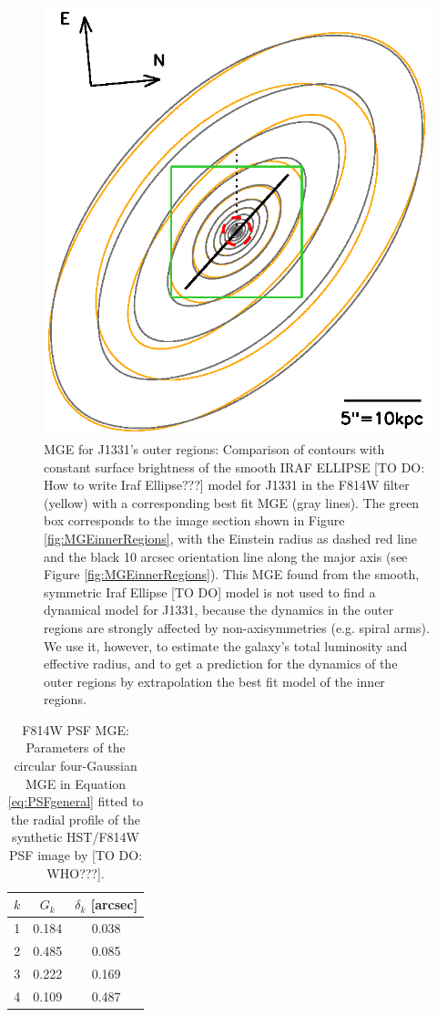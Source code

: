 \begin{figure}
\centering
\includegraphics[width=0.8\columnwidth]{fig/1331F814W_MGE_disk_L.ps}
\caption{MGE for J1331's outer regions: Comparison of contours with constant surface brightness of the smooth IRAF ELLIPSE [TO DO: How to write Iraf Ellipse???] model for J1331 in the F814W filter (yellow) with a corresponding best fit MGE (gray lines). The green box corresponds to the image section shown in Figure \ref{fig:MGEinnerRegions}, with the Einstein radius as dashed red line and the black 10 arcsec orientation line along the major axis (see Figure \ref{fig:MGEinnerRegions}). This MGE found from the smooth, symmetric Iraf Ellipse [TO DO] model is not used to find a dynamical model for J1331, because the dynamics in the outer regions are strongly affected by non-axisymmetries (e.g. spiral arms). We use it, however, to estimate the galaxy's total luminosity and effective radius, and to get a prediction for the dynamics of the outer regions by extrapolation the best fit model of the inner regions.}
\label{fig:MGEouterRegions}
\end{figure}


\begin{table}
\centering
\caption{F814W PSF MGE: Parameters of the circular four-Gaussian MGE in Equation \ref{eq:PSFgeneral} fitted to the radial profile of the synthetic HST/F814W PSF image by [TO DO: WHO???].}
\begin{tabular}{ccc}
\hline
$k$ & $G_k$ & $\delta_k$ [arcsec] \\\hline
1 & 0.184 & 0.038\\
2 & 0.485 & 0.085\\
3 & 0.222 & 0.169\\
4 & 0.109 & 0.487\\\hline
\end{tabular}
\label{tab:PSFMGEF814W}
\end{table}

